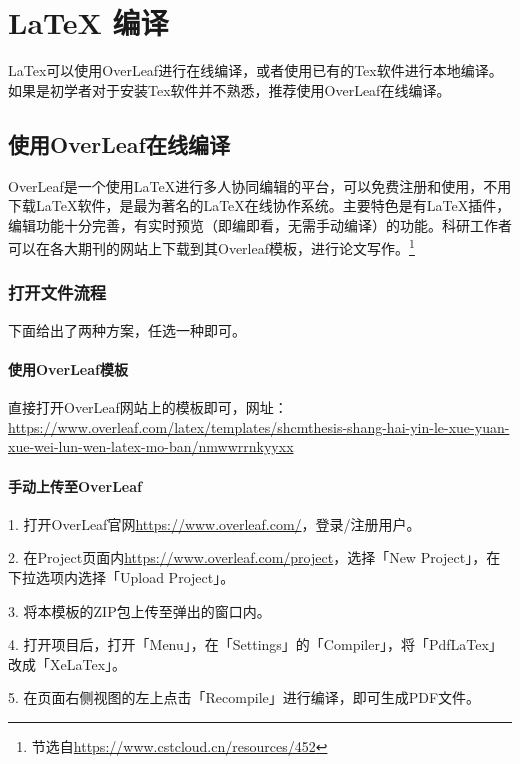 
\chapter{\LaTeX{} 编译}

LaTex可以使用OverLeaf进行在线编译，或者使用已有的Tex软件进行本地编译。如果是初学者对于安装Tex软件并不熟悉，推荐使用OverLeaf在线编译。

\section{使用OverLeaf在线编译}

OverLeaf是一个使用LaTeX进行多人协同编辑的平台，可以免费注册和使用，不用下载LaTeX软件，是最为著名的LaTeX在线协作系统。主要特色是有LaTeX插件，编辑功能十分完善，有实时预览（即编即看，无需手动编译）的功能。科研工作者可以在各大期刊的网站上下载到其Overleaf模板，进行论文写作。\footnote{节选自\url{https://www.cstcloud.cn/resources/452}}

\subsection{打开文件流程}

下面给出了两种方案，任选一种即可。

\subsubsection{使用OverLeaf模板}

直接打开OverLeaf网站上的模板即可，网址：\url{https://www.overleaf.com/latex/templates/shcmthesis-shang-hai-yin-le-xue-yuan-xue-wei-lun-wen-latex-mo-ban/nmwwrrnkyyxx}

\subsubsection{手动上传至OverLeaf}

1. 打开OverLeaf官网\url{https://www.overleaf.com/}，登录/注册用户。

2. 在Project页面内\url{https://www.overleaf.com/project}，选择「New Project」，在下拉选项内选择「Upload Project」。

3. 将本模板的ZIP包上传至弹出的窗口内。


4. 打开项目后，打开「Menu」，在「Settings」的「Compiler」，将「PdfLaTex」改成「XeLaTex」。


5. 在页面右侧视图的左上点击「Recompile」进行编译，即可生成PDF文件。


